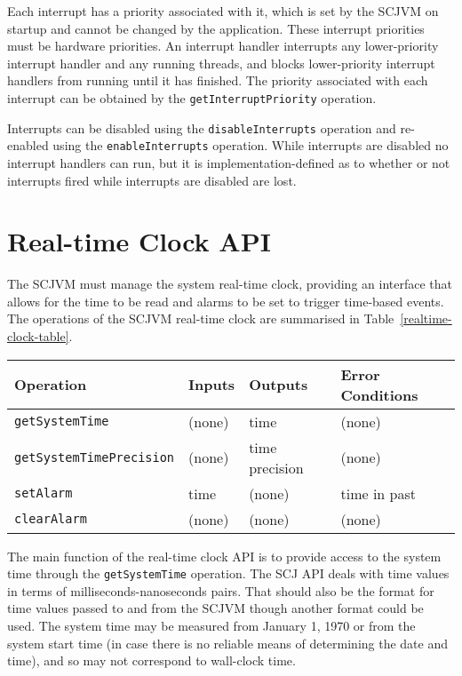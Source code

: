 \documentclass[a4paper,10pt]{report}
\begin{document}
Each interrupt has a priority associated with it, which is set by the
SCJVM on startup and cannot be changed by the application.
These interrupt priorities must be hardware priorities.
An interrupt handler interrupts any lower-priority interrupt handler
and any running threads, and blocks lower-priority interrupt handlers
from running until it has finished.
The priority associated with each interrupt can be obtained by the
\texttt{get\-Interrupt\-Priority} operation.

Interrupts can be disabled using the \texttt{disable\-Interrupts}
operation and re-enabled using the \texttt{enable\-Interrupts}
operation.
While interrupts are disabled no interrupt handlers can run, but it is
implementation-defined as to whether or not interrupts fired while
interrupts are disabled are lost.

\section{Real-time Clock API}
\label{realtime-clock-section}

The SCJVM must manage the system real-time clock, providing an
interface that allows for the time to be read and alarms to be set to
trigger time-based events.
The operations of the SCJVM real-time clock are summarised in
Table~\ref{realtime-clock-table}.

\begin{table*}[ht]
  \centering
  \footnotesize
  \begin{tabular}{|l|p{1.2cm}|p{2cm}|p{2.6cm}|}
    Operation & Inputs & Outputs & Error Conditions \\
    \hline
    \texttt{getSystemTime} &
    (none) &
    time &
    (none)
    \\\texttt{getSystemTimePrecision} &
    (none) &
    time precision &
    (none)
    \\\texttt{setAlarm} &
    time &
    (none) &
    time in past
    \\\texttt{clearAlarm} &
    (none) &
    (none) &
    (none)
  \end{tabular}
  \caption{The operations of the SCJVM real-time clock}
  \label{realtime-clock-table}
\end{table*}

The main function of the real-time clock API is to provide access to
the system time through the \texttt{get\-System\-Time} operation.
The SCJ API deals with time values in terms of
milliseconds-nanoseconds pairs.
That should also be the format for time values passed to and from the
SCJVM though another format could be used.
The system time may be measured from January 1, 1970 or from the
system start time (in case there is no reliable means of determining
the date and time), and so may not correspond to wall-clock time.
\end{document}
